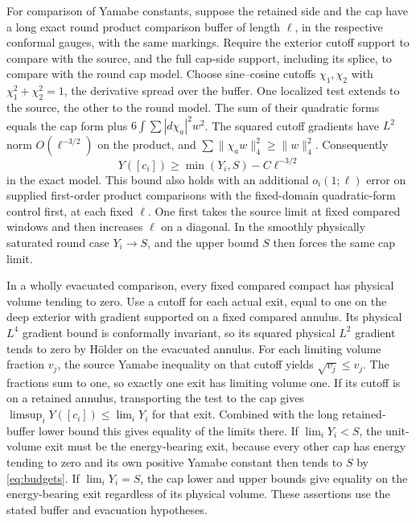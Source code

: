 \documentclass[11pt,letterpaper]{article}
\numberwithin{equation}{section}
\theoremstyle{remark}
\begin{document}
For comparison of Yamabe constants, suppose the retained side
and the cap have a long exact round product comparison buffer of
length \(\ell\), in the respective conformal gauges, with the same
markings. Require the exterior cutoff support to compare with the
source, and the full cap-side support, including its splice,
to compare with the round cap model. Choose sine--cosine cutoffs
\(\chi_1,\chi_2\) with
\(\chi_1^2+\chi_2^2=1\), the derivative spread over the buffer.
One localized test extends to the source, the other to the
round model. The sum of their quadratic forms equals the cap
form plus \(6\int\sum|d\chi_a|^2w^2\). The squared cutoff gradients
have \(L^2\) norm \(O(\ell^{-3/2})\) on the product, and
\(\sum\|\chi_aw\|_4^2\ge\|w\|_4^2\). Consequently
\[
 Y([c_i])\ge \min(Y_i,S)-C\ell^{-3/2}
\]
in the exact model. This bound also holds with an additional
\(o_i(1;\ell)\) error on supplied first-order product comparisons
with the fixed-domain quadratic-form control first, at each
fixed \(\ell\). One first takes the source limit at fixed
compared windows and then increases \(\ell\) on a diagonal.
In the smoothly physically saturated round case \(Y_i\to S\),
and the upper bound \(S\) then forces the same cap limit.

In a wholly evacuated comparison, every fixed compared compact
has physical volume tending to zero. Use a cutoff for each
actual exit, equal to one on the deep exterior with gradient
supported on a fixed compared annulus. Its physical \(L^4\) gradient
bound is conformally invariant, so its squared physical \(L^2\)
gradient tends to zero by H\"older on the evacuated annulus.
For each limiting volume fraction \(v_j\), the source Yamabe
inequality on that cutoff yields \(\sqrt{v_j}\le v_j\).
The fractions sum to one, so exactly one exit has limiting
volume one. If its cutoff is on a retained annulus, transporting
the test to the cap gives \(\limsup_iY([c_i])\le\lim_iY_i\) for
that exit. Combined with the long retained-buffer lower bound
this gives equality of the limits there. If \(\lim_iY_i<S\), the
unit-volume exit must be the energy-bearing exit, because every
other cap has energy tending to zero and its own positive
Yamabe constant then tends to \(S\) by \eqref{eq:budgets}.
If \(\lim_iY_i=S\), the cap lower and upper bounds give equality
on the energy-bearing exit regardless of its physical volume.
These assertions use the stated buffer and evacuation hypotheses.
\end{document}

